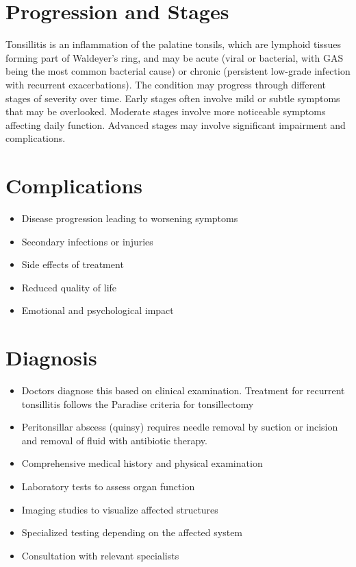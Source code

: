 \section{Progression and Stages}
Tonsillitis is an inflammation of the palatine tonsils, which are lymphoid tissues forming part of Waldeyer's ring, and may be acute (viral or bacterial, with GAS being the most common bacterial cause) or chronic (persistent low-grade infection with recurrent exacerbations). The condition may progress through different stages of severity over time. Early stages often involve mild or subtle symptoms that may be overlooked. Moderate stages involve more noticeable symptoms affecting daily function. Advanced stages may involve significant impairment and complications.
\section{Complications}
\begin{itemize}[noitemsep]
  \item Disease progression leading to worsening symptoms
  \item Secondary infections or injuries
  \item Side effects of treatment
  \item Reduced quality of life
  \item Emotional and psychological impact
\end{itemize}
\section{Diagnosis}
\begin{itemize}[noitemsep]
  \item Doctors diagnose this based on clinical examination. Treatment for recurrent tonsillitis follows the Paradise criteria for tonsillectomy
  \item Peritonsillar abscess (quinsy) requires needle removal by suction or incision and removal of fluid with antibiotic therapy.
  \item Comprehensive medical history and physical examination
  \item Laboratory tests to assess organ function
  \item Imaging studies to visualize affected structures
  \item Specialized testing depending on the affected system
  \item Consultation with relevant specialists
\end{itemize}
